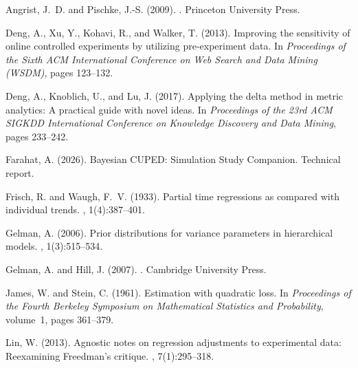 \documentclass[12pt]{article}
\theoremstyle{plain}
\theoremstyle{definition}
\begin{document}

\begin{thebibliography}{}

Angrist, J.~D. and Pischke, J.-S. (2009).
.
\newblock Princeton University Press.

Deng, A., Xu, Y., Kohavi, R., and Walker, T. (2013).
\newblock Improving the sensitivity of online controlled experiments by utilizing
  pre-experiment data.
\newblock In {\em Proceedings of the Sixth ACM International Conference on Web
  Search and Data Mining (WSDM)}, pages 123--132.

Deng, A., Knoblich, U., and Lu, J. (2017).
\newblock Applying the delta method in metric analytics: A practical guide with
  novel ideas.
\newblock In {\em Proceedings of the 23rd ACM SIGKDD International Conference
  on Knowledge Discovery and Data Mining}, pages 233--242.

Farahat, A. (2026).
\newblock Bayesian CUPED: Simulation Study Companion.
\newblock Technical report.

Frisch, R. and Waugh, F.~V. (1933).
\newblock Partial time regressions as compared with individual trends.
, 1(4):387--401.

Gelman, A. (2006).
\newblock Prior distributions for variance parameters in hierarchical models.
, 1(3):515--534.

Gelman, A. and Hill, J. (2007).
.
\newblock Cambridge University Press.

James, W. and Stein, C. (1961).
\newblock Estimation with quadratic loss.
\newblock In {\em Proceedings of the Fourth Berkeley Symposium on Mathematical
  Statistics and Probability}, volume~1, pages 361--379.

Lin, W. (2013).
\newblock Agnostic notes on regression adjustments to experimental data:
  Reexamining Freedman's critique.
, 7(1):295--318.


\end{thebibliography}
\end{document}
